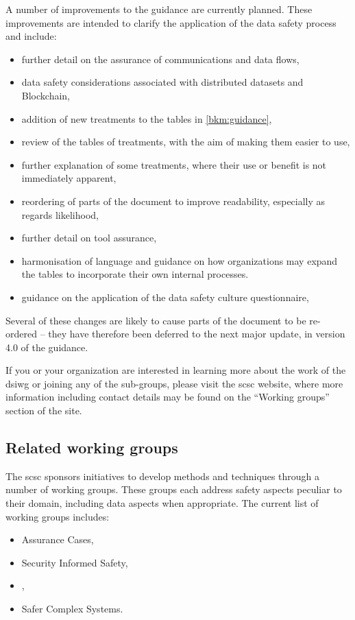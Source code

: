 A number of improvements to the guidance are currently planned.
These improvements are intended to clarify the application of the data safety process
and include:
\begin{itemize}
	\item further detail on the assurance of communications and data flows,
	\item data safety considerations associated with distributed \glspl{dataset} and Blockchain,
	\item addition of new \glspl{treatment} to the tables in \autoref{bkm:guidance},
	\item review of the tables of \glspl{treatment}, with the aim of making them easier to use,
	\item further explanation of some \glspl{treatment}, where their use or benefit is not immediately apparent, 
	\item reordering of parts of the document to improve readability, especially as regards likelihood, 
	\item further detail on tool assurance,
	\item harmonisation of language and guidance on how organizations may expand the tables to incorporate their own internal processes.
	\item guidance on the application of the data safety culture questionnaire,
\end{itemize}
Several of these changes are likely to
cause parts of the document to be re-ordered -- they have therefore been deferred to the next major update, in version 4.0 of the guidance.

If you or your organization are interested in learning more about the work of the \gls{dsiwg} or joining any of the sub-groups,
please visit the \gls{scsc} website, where more information including contact details may be found on the ``Working groups'' section of the site.
%
%
%
\subsection*{Related working groups}
The \gls{scsc} sponsors initiatives to develop methods and techniques through a number of working groups. These groups each address safety aspects peculiar to their domain, including data aspects when appropriate. The current list of working groups includes:
%
\begin{itemize}
	\item Assurance Cases,
	\item Security Informed Safety,
	\item {},
	\item Safer Complex Systems. 
\end{itemize}
%
%
\clearpage
%

